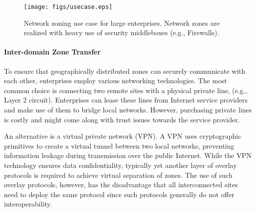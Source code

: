 \begin{figure}[t]
\begin{center}
\texttt{[image: figs/usecase.eps]}
\end{center}
\caption{Network zoning use case for large enterprises. Network zones are 
realized with heavy use of security middleboxes (e.g., Firewalls).}
\label{fig:usecase}
\end{figure}

\paragraph{Inter-domain Zone Transfer}
To ensure that geographically distributed zones can securely communicate with each other, 
enterprises employ various networking technologies. The most common choice is connecting
two remote sites with a physical private line, (e.g., Layer 2 circuit). %
Enterprises 
can lease these lines from Internet service providers and make use of them to bridge local 
networks. However, purchasing private lines is costly and might come along 
with trust issues towards the service provider. 

An alternative is a virtual private 
network (VPN). A VPN uses cryptographic primitives to create a virtual tunnel between two 
local networks, preventing information leakage during transmission over the public Internet. 
While the VPN technology ensures data confidentiality, typically yet another layer of overlay 
protocols is required to achieve virtual separation of zones. The use of such overlay 
protocols, however, has the disadvantage that all interconnected sites need to deploy the same 
protocol since such protocols generally do not offer interoperability.



